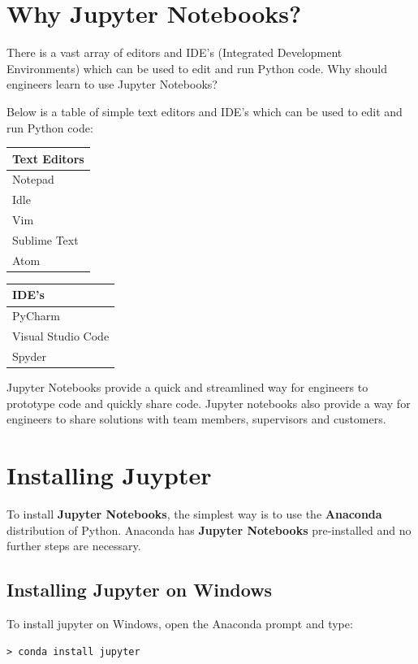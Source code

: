 \documentclass{book}
\begin{document}
    \section{Why Jupyter Notebooks?}\label{why-jupyter-notebooks}

    There is a vast array of editors and IDE's (Integrated Development
Environments) which can be used to edit and run Python code. Why should
engineers learn to use Jupyter Notebooks?

Below is a table of simple text editors and IDE's which can be used to
edit and run Python code:

\begin{longtable}[]{@{}l@{}}
\toprule
Text Editors\tabularnewline
\midrule
\endhead
Notepad\tabularnewline
Idle\tabularnewline
Vim\tabularnewline
Sublime Text\tabularnewline
Atom\tabularnewline
\bottomrule
\end{longtable}

\begin{longtable}[]{@{}l@{}}
\toprule
IDE's\tabularnewline
\midrule
\endhead
PyCharm\tabularnewline
Visual Studio Code\tabularnewline
Spyder\tabularnewline
\bottomrule
\end{longtable}

Jupyter Notebooks provide a quick and streamlined way for engineers to
prototype code and quickly share code. Jupyter notebooks also provide a
way for engineers to share solutions with team members, supervisors and
customers.

    \section{Installing Juypter}\label{installing-juypter}

    To install \textbf{Jupyter Notebooks}, the simplest way is to use the
\textbf{Anaconda} distribution of Python. Anaconda has \textbf{Jupyter
Notebooks} pre-installed and no further steps are necessary.

    \subsection{Installing Jupyter on
Windows}\label{installing-jupyter-on-windows}

To install jupyter on Windows, open the Anaconda prompt and type:

\begin{lstlisting}
> conda install jupyter
\end{lstlisting}
\end{document}
